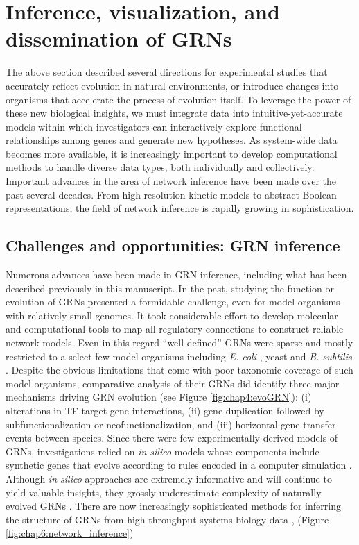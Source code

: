 \section{Inference, visualization, and dissemination of GRNs} 

The above section described several directions for experimental studies that accurately reflect evolution in natural environments, or introduce changes into organisms that accelerate the process of evolution itself. To leverage the power of these new biological insights, we must integrate data into intuitive-yet-accurate models within which investigators can interactively explore functional relationships among genes and generate new hypotheses. As system-wide data becomes more available, it is increasingly important to develop computational methods to handle diverse data types, both individually and collectively. Important advances in the area of network inference have been made over the past several decades. From high-resolution kinetic models to abstract Boolean representations, the field of network inference is rapidly growing in sophistication. 

\subsection{Challenges and opportunities: GRN inference}

Numerous advances have been made in GRN inference, including what has been described previously in this manuscript.  In the past, studying the function or evolution of GRNs presented a formidable challenge, even for model organisms with relatively small genomes.  It took considerable effort to develop molecular and computational tools to map all regulatory connections to construct reliable network models.  Even in this regard ``well-defined'' GRNs were sparse and mostly restricted to a select few model organisms including \textit{E. coli} \cite{salgado_regulondb_2006,madan_babu_evolution_2003}, yeast \cite{lee_transcriptional_2002} and \textit{B. subtilis} \cite{moreno-campuzano_identification_2006,makita_dbtbs:_2004}.  Despite the obvious limitations that come with poor taxonomic coverage of such model organisms, comparative analysis of their GRNs did identify three major mechanisms driving GRN evolution (see Figure \ref{fig:chap4:evoGRN}): (i) alterations in TF-target gene interactions, (ii) gene duplication followed by subfunctionalization or neofunctionalization, and (iii) horizontal gene transfer events  between species.  Since there were few experimentally derived models of GRNs, investigations relied on \textit{in silico} models whose components include synthetic genes that evolve according to rules encoded in a computer simulation \cite{wagner_genetic_1996,milo_superfamilies_2004,siegal_functional_2007}.  Although \textit{in silico} approaches are extremely informative and will continue to yield valuable insights, they grossly underestimate complexity of naturally evolved GRNs \cite{de_smet_advantages_2010}.  There are now increasingly sophisticated methods for inferring the structure of GRNs from high-throughput systems biology data \cite{bonneau_learning_2008,gardner_inferring_2003}, (Figure \ref{fig:chap6:network_inference})  


